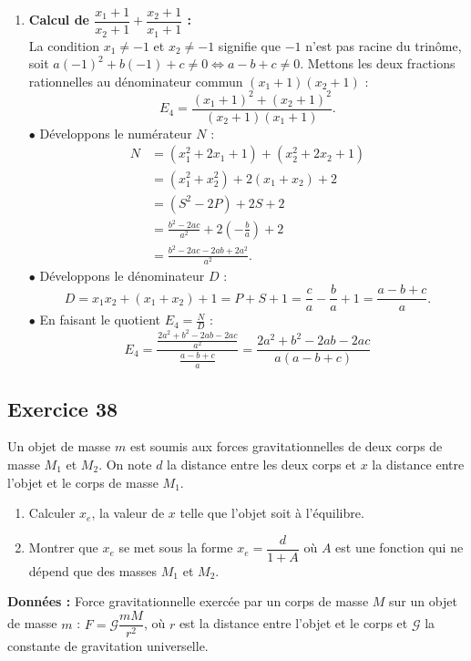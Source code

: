 \documentclass[11pt,a4paper]{article}
\begin{document}
\begin{correctionbox}
\begin{enumerate}
    \item \textbf{Calcul de $\dfrac{x_1 + 1}{x_2 + 1} + \dfrac{x_2 + 1}{x_1 + 1}$ :}\\
    La condition $x_1 \neq -1$ et $x_2 \neq -1$ signifie que $-1$ n'est pas racine du trinôme, soit $a(-1)^2 + b(-1) + c \neq 0 \iff a - b + c \neq 0$.
    Mettons les deux fractions rationnelles au dénominateur commun $(x_1 + 1)(x_2 + 1)$ :
    \[
    E_4 = \frac{(x_1 + 1)^2 + (x_2 + 1)^2}{(x_2 + 1)(x_1 + 1)}.
    \]
    $\bullet$ Développons le numérateur $N$ :
    \[
    \begin{aligned}
    N &= (x_1^2 + 2x_1 + 1) + (x_2^2 + 2x_2 + 1) \\
    &= (x_1^2 + x_2^2) + 2(x_1 + x_2) + 2 \\
    &= (S^2 - 2P) + 2S + 2 \\
    &= \frac{b^2 - 2ac}{a^2} + 2\left(-\frac{b}{a}\right) + 2 \\
    &= \frac{b^2 - 2ac - 2ab + 2a^2}{a^2}.
    \end{aligned}
    \]
    $\bullet$ Développons le dénominateur $D$ :
    \[
    D = x_1 x_2 + (x_1 + x_2) + 1 = P + S + 1 = \frac{c}{a} - \frac{b}{a} + 1 = \frac{a - b + c}{a}.
    \]
    $\bullet$ En faisant le quotient $E_4 = \frac{N}{D}$ :
    \[
    E_4 = \frac{\frac{2a^2 + b^2 - 2ab - 2ac}{a^2}}{\frac{a - b + c}{a}} = \boxed{\frac{2a^2 + b^2 - 2ab - 2ac}{a(a - b + c)}}
    \]
\end{enumerate}
\end{correctionbox}

\subsection*{Exercice 38}
Un objet de masse $m$ est soumis aux forces gravitationnelles de deux corps de masse $M_1$ et $M_2$. On note $d$ la distance entre les deux corps et $x$ la distance entre l'objet et le corps de masse $M_1$.
\begin{enumerate}
    \item Calculer $x_e$, la valeur de $x$ telle que l'objet soit à l'équilibre.
    \item Montrer que $x_e$ se met sous la forme $x_e = \dfrac{d}{1 + A}$ où $A$ est une fonction qui ne dépend que des masses $M_1$ et $M_2$.
\end{enumerate}
\textbf{Données :} Force gravitationnelle exercée par un corps de masse $M$ sur un objet de masse $m$ :
$F = \mathcal{G}\dfrac{mM}{r^2}$, où $r$ est la distance entre l'objet et le corps et $\mathcal{G}$ la constante de gravitation universelle.
\end{document}
